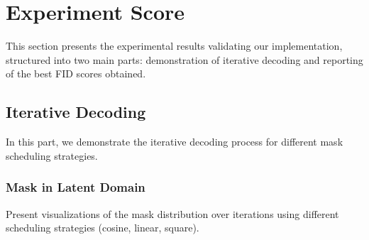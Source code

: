 \section{Experiment Score}
\label{sec:experiment}

This section presents the experimental results validating our implementation, structured into two main parts: demonstration of iterative decoding and reporting of the best FID scores obtained.

\subsection{Iterative Decoding}
In this part, we demonstrate the iterative decoding process for different mask scheduling strategies.

\subsubsection{Mask in Latent Domain}
Present visualizations of the mask distribution over iterations using different scheduling strategies (cosine, linear, square).

\begin{figure}[H]
    \centering
\end{figure}


